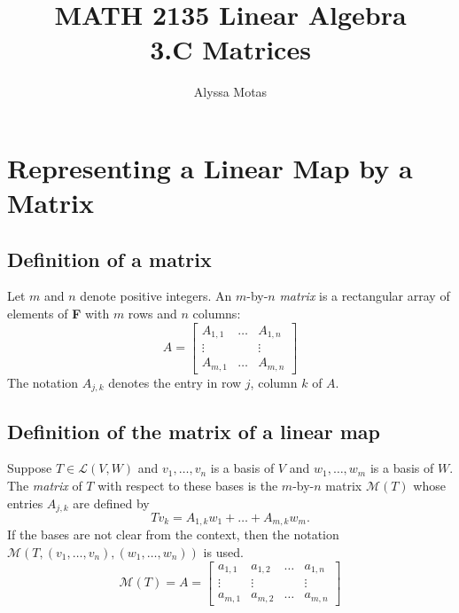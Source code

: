 \documentclass[11pt]{article}
\title{\textbf{MATH 2135 Linear Algebra} \\ 3.C Matrices}
\author{Alyssa Motas}
\begin{document}
    \maketitle

    \pagebreak

    \tableofcontents

    \pagebreak

    \section{Representing a Linear Map by a Matrix}

    \subsection{Definition of a matrix}

    Let $m$ and $n$ denote positive integers. An $m$-by-$n$ \emph{matrix} is a rectangular array of elements of \textbf{F} with $m$ rows and $n$ columns:
    \begin{equation*}
        A = \begin{bmatrix}
                A_{1,1} & \dots & A_{1,n} \\
                \vdots  &       &  \vdots \\
                A_{m,1} & \dots &  A_{m,n}
            \end{bmatrix}
    \end{equation*}
    The notation \(A_{j,k}\) denotes the entry in row $j$, column $k$ of $A$.

    \subsection{Definition of the matrix of a linear map}

    Suppose \(T \in \mathcal{L}(V,W)\) and \(v_1, \dots, v_n\) is a basis of $V$ and \(w_1, \dots, w_m\) is a basis of $W$. The \emph{matrix} of $T$ with respect to these bases is the $m$-by-$n$ matrix \(\mathcal{M}(T)\) whose entries \(A_{j,k}\) are defined by \[Tv_k = A_{1,k} w_1 + \dots + A_{m,k} w_m.\] If the bases are not clear from the context, then the notation \(\mathcal{M}(T,(v_1, \dots, v_n),(w_1, \dots, w_n))\) is used.
    \begin{equation*}
        \mathcal{M}(T) = A = \begin{bmatrix}
                                a_{1,1} & a_{1,2} & \dots & a_{1,n} \\
                                \vdots  &  \vdots     &       &   \vdots \\
                                a_{m,1} & a_{m,2} & \dots & a_{m,n}
                             \end{bmatrix}
    \end{equation*}
\end{document}
